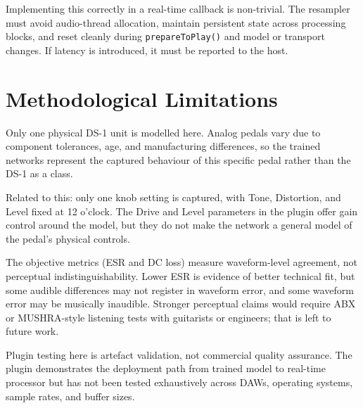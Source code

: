 Implementing this correctly in a real-time callback is non-trivial. The resampler must avoid audio-thread allocation, maintain persistent state across processing blocks, and reset cleanly during \texttt{prepareToPlay()} and model or transport changes. If latency is introduced, it must be reported to the host.

\section{Methodological Limitations}
\label{sec:methodological-limitations}

Only one physical DS-1 unit is modelled here. Analog pedals vary due to component tolerances, age, and manufacturing differences, so the trained networks represent the captured behaviour of this specific pedal rather than the DS-1 as a class.

Related to this: only one knob setting is captured, with Tone, Distortion, and Level fixed at 12 o'clock. The Drive and Level parameters in the plugin offer gain control around the model, but they do not make the network a general model of the pedal's physical controls.

The objective metrics (ESR and DC loss) measure waveform-level agreement, not perceptual indistinguishability. Lower ESR is evidence of better technical fit, but some audible differences may not register in waveform error, and some waveform error may be musically inaudible. Stronger perceptual claims would require ABX or MUSHRA-style listening tests with guitarists or engineers; that is left to future work.

Plugin testing here is artefact validation, not commercial quality assurance. The plugin demonstrates the deployment path from trained model to real-time processor but has not been tested exhaustively across DAWs, operating systems, sample rates, and buffer sizes.
